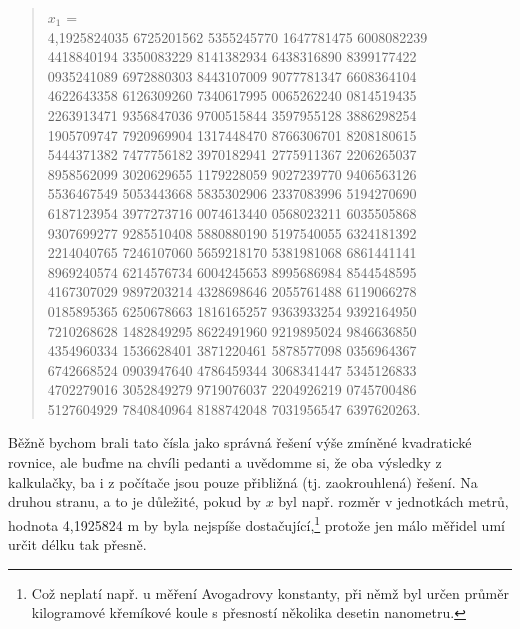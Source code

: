 \documentclass[a4paper,oneside,12pt]{article}
\begin{document}
\begin{quote}
$x_1$ = \\
4,1925824035 6725201562 5355245770 1647781475 6008082239\\
4418840194 3350083229 8141382934 6438316890 8399177422 \\
0935241089 6972880303 8443107009 9077781347 6608364104 \\
4622643358 6126309260 7340617995 0065262240 0814519435 \\
2263913471 9356847036 9700515844 3597955128 3886298254 \\
1905709747 7920969904 1317448470 8766306701 8208180615 \\
5444371382 7477756182 3970182941 2775911367 2206265037 \\
8958562099 3020629655 1179228059 9027239770 9406563126\\
5536467549 5053443668 5835302906 2337083996 5194270690\\
6187123954 3977273716 0074613440 0568023211 6035505868\\
9307699277 9285510408 5880880190 5197540055 6324181392\\
2214040765 7246107060 5659218170 5381981068 6861441141\\
8969240574 6214576734 6004245653 8995686984 8544548595 \\
4167307029 9897203214 4328698646 2055761488 6119066278 \\
0185895365 6250678663 1816165257 9363933254 9392164950 \\
7210268628 1482849295 8622491960 9219895024 9846636850 \\
4354960334 1536628401 3871220461 5878577098 0356964367 \\
6742668524 0903947640 4786459344 3068341447 5345126833 \\
4702279016 3052849279 9719076037 2204926219 0745700486\\
5127604929 7840840964 8188742048 7031956547 6397620263.\\
\end{quote}
%
Běžně bychom brali tato čísla jako správná řešení výše 
zmíněné kvadratické rovnice, ale buďme na chvíli pedanti
a uvědomme si, že oba výsledky z kalkulačky, ba i z počítače
jsou pouze přibližná (tj. zaokrouhlená) řešení. Na druhou 
stranu, a to je důležité, pokud by $x$ byl např. rozměr
v jednotkách metrů, hodnota 4,1925824 m by byla 
nejspíše dostačující,\footnote{Což neplatí např. u měření
Avogadrovy konstanty, při němž byl určen průměr 
kilogramové křemíkové koule s přesností několika desetin nanometru.}
protože jen málo měřidel umí určit délku tak přesně.
\end{document}

